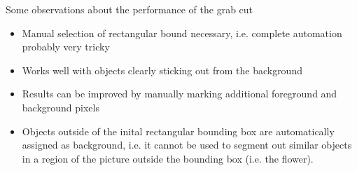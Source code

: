 \documentclass[11pt,a4paper]{article}
\begin{document}
Some observations about the performance of the grab cut
\begin{itemize}
\item Manual selection of rectangular bound necessary, i.e. complete automation probably very tricky
\item Works well with objects clearly sticking out from the background
\item Results can be improved by manually marking additional foreground and background pixels
\item Objects outside of the inital rectangular bounding box are automatically assigned as background, i.e. it cannot be used to segment out similar objects in a region of the picture outside the  bounding box (i.e. the flower).
\end{itemize}
\end{document}
